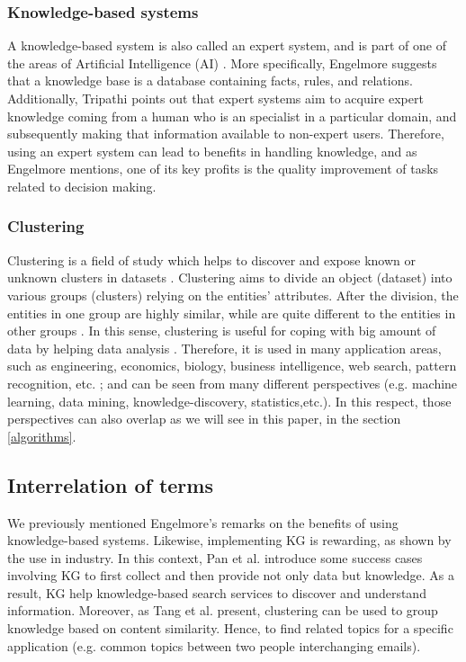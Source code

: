 \documentclass[runningheads]{llncs}
\begin{document}
\subsubsection{Knowledge-based systems} \label{knowledge-based}
A knowledge-based system is also called an expert system, and is part of one of the areas of Artificial Intelligence (AI) \cite{Tripathi}. More specifically, Engelmore \cite{Engelmore} suggests that a knowledge base is a database containing facts, rules, and relations. Additionally, Tripathi \cite{Tripathi} points out that expert systems aim to acquire expert knowledge coming from a human who is an specialist in a particular domain, and subsequently making that information available to non-expert users.
Therefore, using an expert system can lead to benefits in handling knowledge, and as Engelmore \cite{Engelmore} mentions, one of its key profits is the quality improvement of tasks related to decision making.


\subsubsection{Clustering} \label{clustering}
Clustering is a field of study which helps to discover and expose known or unknown clusters in datasets \cite{Han} \cite{Mirkin}. Clustering aims to divide an object (dataset) into various groups (clusters) relying on the entities' attributes. After the division, the entities in one group are highly similar, while are quite different to the entities in other groups \cite{Han}. In this sense, clustering is useful for coping with big amount of data by helping data analysis \cite{Pedrycz} \cite{Mirkin}. Therefore, it is used in many application areas, such as engineering, economics, biology, business intelligence, web search, pattern recognition, etc. \cite{Pedrycz} \cite{Han}; and can be seen from many different perspectives (e.g. machine learning, data mining, knowledge-discovery, statistics,etc.). In this respect, those perspectives can also overlap as we will see in this paper, in the section \ref{algorithms}.


\subsection{Interrelation of terms} \label{interrelation}
We previously mentioned Engelmore's remarks on the benefits of using knowledge-based systems. Likewise, implementing KG is 
rewarding, as shown by the use in industry. In this context, Pan et al. \cite{Pan} introduce some success cases involving KG to first collect and then provide not only data but knowledge. As a result, KG help knowledge-based search services to discover and understand information. Moreover, as Tang et al. \cite{Tang} present, clustering can be used to group knowledge based on content similarity. Hence, to find related topics for a specific application (e.g. common topics between two people interchanging emails).
\end{document}
